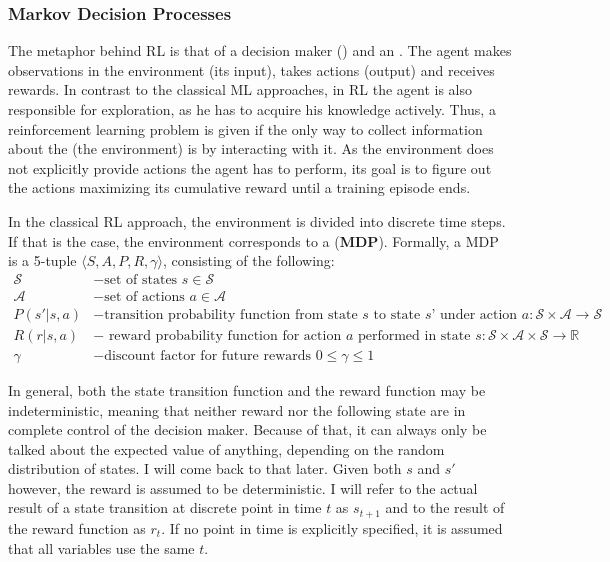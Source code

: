 \subsubsection{Markov Decision Processes}

The metaphor behind RL is that of a decision maker () and an . The agent makes observations in the environment (its input), takes actions (output) and receives rewards. In contrast to the classical ML approaches, in RL the agent is also responsible for exploration, as he has to acquire his knowledge actively. Thus, a reinforcement learning problem is given if the only way to collect information about the  (the environment) is by interacting with it. As the environment does not explicitly provide actions the agent has to perform, its goal is to figure out the actions maximizing its cumulative reward until a training episode ends.

In the classical RL approach, the environment is divided into discrete time steps. If that is the case, the environment corresponds to a  (\textbf{MDP}). Formally, a MDP is a 5-tuple $\langle S, A, P, R, \gamma \rangle$, consisting of the following:\\
\begin{align*}
\mathcal{S} &- \text{set of states } s\in \mathcal{S}\\
\mathcal{A} &- \text{set of actions } a \in \mathcal{A}\\
P(s'|s, a) &- \text{transition probability function from state } s \text{ to state } s’ \text{ under action } a: \mathcal{S} \times \mathcal{A} \rightarrow \mathcal{S} \\
R(r|s, a) &- \text{ reward probability function for action } a \text{ performed in state } s: \mathcal{S} \times \mathcal{A} \times \mathcal{S} \rightarrow \mathds{R} \\
\gamma &- \text{discount factor for future rewards } 0 \leq \gamma \leq 1
\end{align*}

In general, both the state transition function and the reward function may be indeterministic, meaning that neither reward nor the following state are in complete control of the decision maker. Because of that, it can always only be talked about the expected value of anything, depending on the random distribution of states. I will come back to that later. Given both $s$ and $s'$ however, the reward is assumed to be deterministic. I will refer to the actual result of a state transition at discrete point in time $t$ as $s_{t+1}$ and to the result of the reward function as $r_t$. If no point in time is explicitly specified, it is assumed that all variables use the same $t$.\\

